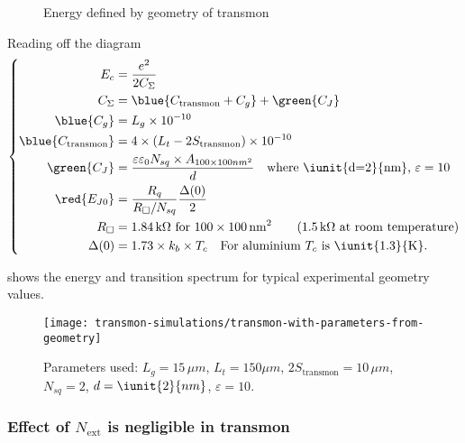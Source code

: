 \begin{figure}[h]
  \centering {}
  \caption{\small      Energy      defined      by      geometry      of
    transmon\label{fig:cooper_pair_box_5_geometry}}
\end{figure}

Reading off the diagram
\begin{equation}
  \left\{
    \begin{aligned}
      E_c& = \frac{e^2}{2C_\Sigma}\\
      C_{\Sigma} & = \blue{C_\text{transmon} + C_g}+ \green{C_J}\\
      \blue{C_{g}} & = L_{g} \times 10^{-10}\\
      \blue{C_{\text{transmon}}} & = 4\times\left( L_{t} - 2S_{\text{transmon}} \right) \times 10^{-10}\\
      \green{C_J}   &   =  \frac{\varepsilon\varepsilon_0N_{sq}   \times
        A_{100\times100nm^2}}{d} \quad
      \text{where \iunit{d=2}{nm}, $\varepsilon = 10$}\\
      \red{E_{J0}} & = \frac{R_q}{R_{\square}/N_{sq}}\frac{\Delta(0)}{2}\\
      R_{\square} & = 1.84\,\text{k}\Omega \text{ for }100 \times 100\,\text{nm}^2 \qquad (1.5\,\text{k}\Omega \text{ at room temperature})\\
      \Delta(0)  & =  1.73  \times k_{b}  \times  T_{c} \quad  \text{For
        aluminium $T_{c}$ is \iunit{1.3}{K}}.
    \end{aligned}\right.
\end{equation}

  shows  the  energy
and transition spectrum for typical experimental geometry values.

\begin{figure}[h]
  \centering
  \texttt{[image: transmon-simulations/transmon-with-parameters-from-geometry]}
  \caption{\small    Parameters    used:    $L_{g}   =    15\,\mu    m$,
    $L_{t} = 150\mu m$,  $2S_{\text{transmon}} = 10\,\mu m$, $N_{sq}=2$,
    $d         =          \iunit{2}{nm}$,         $\varepsilon         =
    10$. \label{fig:transmon-with-parameters-from-geometry}}
\end{figure}

\subsubsection{Effect of $N_{\text{ext}}$ is negligible in transmon}
\label{sec:effect-n_textext}

